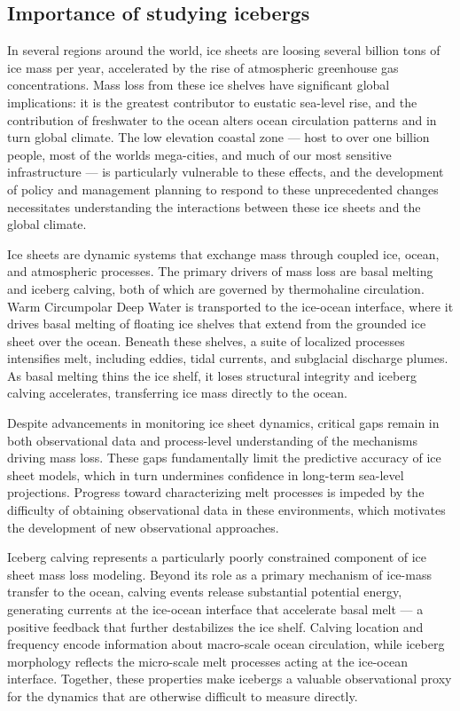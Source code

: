 \documentclass[11pt, letterpaper]{article}
\begin{document}
\subsection{Importance of studying icebergs}

In several regions around the world, ice sheets are loosing several billion tons of ice mass per year, accelerated by the rise of atmospheric greenhouse gas concentrations. Mass loss from these ice shelves have significant global implications: it is the greatest contributor to eustatic sea-level rise, and the contribution of freshwater to the ocean alters ocean circulation patterns and in turn global climate. The low elevation coastal zone --- host to over one billion people, most of the worlds mega-cities, and much of our most sensitive infrastructure --- is particularly vulnerable to these effects, and the development of policy and management planning to respond to these unprecedented changes necessitates understanding the interactions between these ice sheets and the global climate.~\parencite{sadai2025, neumann2015}

Ice sheets are dynamic systems that exchange mass through coupled ice, ocean, and atmospheric processes. The primary drivers of mass loss are basal melting and iceberg calving, both of which are governed by thermohaline circulation. Warm Circumpolar Deep Water is transported to the ice-ocean interface, where it drives basal melting of floating ice shelves that extend from the grounded ice sheet over the ocean. Beneath these shelves, a suite of localized processes intensifies melt, including eddies, tidal currents, and subglacial discharge plumes. As basal melting thins the ice shelf, it loses structural integrity and iceberg calving accelerates, transferring ice mass directly to the ocean.~\parencite{rosevear2025, smith2020}

Despite advancements in monitoring ice sheet dynamics, critical gaps remain in both observational data and process-level understanding of the mechanisms driving mass loss. These gaps fundamentally limit the predictive accuracy of ice sheet models, which in turn undermines confidence in long-term sea-level projections. Progress toward characterizing melt processes is impeded by the difficulty of obtaining observational data in these environments, which motivates the development of new observational approaches.~\parencite{sadai2025, neumann2015, rosevear2025, smith2020}

Iceberg calving represents a particularly poorly constrained component of ice sheet mass loss modeling. Beyond its role as a primary mechanism of ice-mass transfer to the ocean, calving events release substantial potential energy, generating currents at the ice-ocean interface that accelerate basal melt --- a positive feedback that further destabilizes the ice shelf. Calving location and frequency encode information about macro-scale ocean circulation, while iceberg morphology reflects the micro-scale melt processes acting at the ice-ocean interface. Together, these properties make icebergs a valuable observational proxy for the dynamics that are otherwise difficult to measure directly.~\parencite{alley2023, shaya2025, fisser2025}
\end{document}
